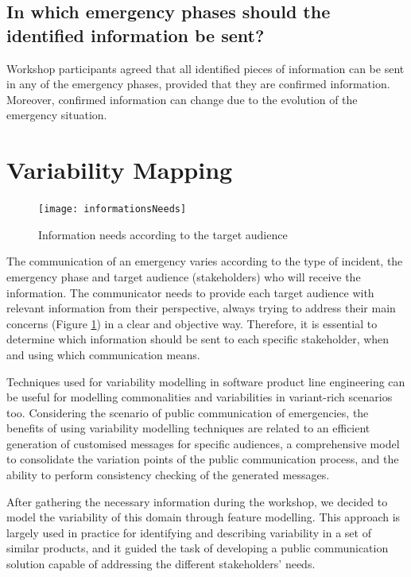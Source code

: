 \subsection*{In which emergency phases should the identified information be sent?}

Workshop participants agreed that all identified pieces of information can be sent in any of the
emergency phases, provided that they are confirmed information. Moreover, confirmed information
can change due to the evolution of the emergency situation. 



\section{Variability Mapping}

\begin{figure}[]
\begin{center}
  \texttt{[image: informationsNeeds]}
\caption{Information needs according to the target audience \cite{panamericanhealthorganization2009}}
\label{fig:informationNeeds}
\end{center}
\end{figure}

The communication of an emergency varies according to the type of incident, the emergency phase and target audience (stakeholders) who will receive the information. The communicator needs
to provide each target audience with relevant information from their perspective, always trying to address their main concerns (Figure \ref{fig:informationNeeds}) in a clear and objective way. Therefore, it is essential to determine which information should be sent to each specific stakeholder, when and using which communication means.

Techniques used for variability modelling in software product line engineering can be useful for modelling commonalities and variabilities in variant-rich scenarios too. Considering the scenario of public communication of emergencies, the benefits of using variability modelling techniques are related to an efficient generation of customised messages for specific audiences, a comprehensive model to consolidate the variation points of the public communication process, and the ability to perform consistency checking of the generated messages.

After gathering the necessary information during the workshop, we decided to model the variability of this domain through feature modelling. This approach is largely used in practice for identifying and describing variability in a set of similar products, and it guided the task of developing a public communication solution capable of addressing the different stakeholders’ needs. 

